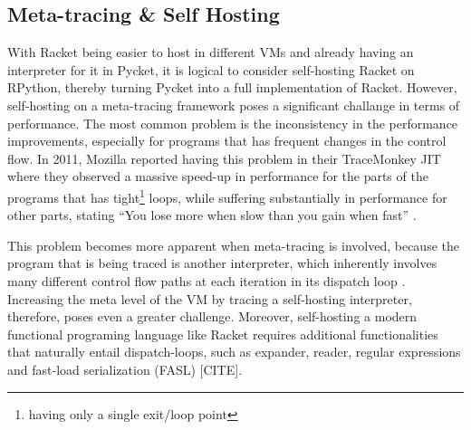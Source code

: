 \subsection{Meta-tracing \& Self Hosting}
\label{subsec:self-hosting-problem}

With Racket being easier to host in different VMs and already having
an interpreter for it in Pycket, it is logical to consider
self-hosting Racket on RPython, thereby turning Pycket into a full
implementation of Racket. However, self-hosting on a meta-tracing
framework poses a significant challange in terms of performance. The
most common problem is the inconsistency in the performance
improvements, especially for programs that has frequent changes in the
control flow. In 2011, Mozilla reported having this problem in their
TraceMonkey JIT where they observed a massive speed-up in performance
for the parts of the programs that has tight\footnote{having only a
  single exit/loop point} loops, while suffering substantially in
performance for other parts, stating ``You lose more when slow than
you gain when fast'' \cite{mozblog}.

This problem becomes more apparent when meta-tracing is involved,
because the program that is being traced is another interpreter, which
inherently involves many different control flow paths at each
iteration in its dispatch loop \cite{bolz15-meta-vm}. Increasing the
meta level of the VM by tracing a self-hosting interpreter, therefore,
poses even a greater challenge. Moreover, self-hosting a modern
functional programing language like Racket requires additional
functionalities that naturally entail dispatch-loops, such as
expander, reader, regular expressions and fast-load serialization
(FASL) [CITE].
